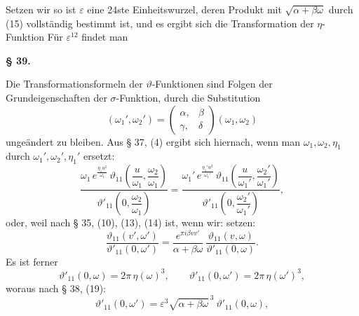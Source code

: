 Setzen wir
so ist $\varepsilon$ eine 24ste Einheitswurzel, deren Produkt mit $\sqrt{\alpha+\beta\omega}$
durch (15) vollständig bestimmt ist, und es ergibt sich die Transformation
 der $\eta$-Funktion
Für $\varepsilon^{12}$ findet man

\begin{center}
\textbf{§ 39. }
\end{center}

Die Transformationsformeln der $\vartheta$-Funktionen sind Folgen
der Grundeigenschaften der $\sigma$-Funktion, durch die Substitution
\[
(\omega_1', \omega_2') = \begin{pmatrix}\alpha, & \beta \\ \gamma, & \delta\end{pmatrix}(\omega_1, \omega_2)
\]
ungeändert zu bleiben. Aus § 37, (4) ergibt sich hiernach, wenn
man $\omega_1, \omega_2, \eta_1$ durch $\omega_1', \omega_2', \eta_1'$ ersetzt:
\[
\frac{\omega_1\, e^{\frac{\eta_1 u^2}{\omega_1}}\, \vartheta_{11}\!\left(\dfrac{u}{\omega_1}, \dfrac{\omega_2}{\omega_1}\right)}{\vartheta'_{11}\!\left(0, \dfrac{\omega_2}{\omega_1}\right)}
=
\frac{\omega_1'\, e^{\frac{\eta_1' u^2}{\omega_1'}}\, \vartheta_{11}\!\left(\dfrac{u}{\omega_1'}, \dfrac{\omega_2'}{\omega_1'}\right)}{\vartheta'_{11}\!\left(0, \dfrac{\omega_2'}{\omega_1'}\right)},
\]
oder, weil nach § 35, (10), (13), (14)
ist, wenn wir:
setzen:
\[
\frac{\vartheta_{11}(v', \omega')}{\vartheta'_{11}(0, \omega')}
= \frac{e^{\pi i\beta v v'}}{\alpha+\beta\omega}\ \frac{\vartheta_{11}(v, \omega)}{\vartheta'_{11}(0, \omega)}.
\]
Es ist ferner
\[
\vartheta'_{11}(0, \omega) = 2\pi\,\eta(\omega)^3, \qquad
\vartheta'_{11}(0, \omega') = 2\pi\,\eta(\omega')^3,
\]
woraus nach § 38, (19):
\[
\vartheta'_{11}(0, \omega') = \varepsilon^3\sqrt{\alpha+\beta\omega}^{\,3}\ \vartheta'_{11}(0, \omega),
\]
